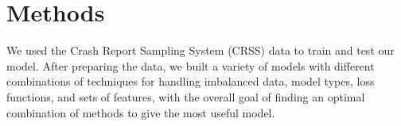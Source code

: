 \section{Methods}

We used the Crash Report Sampling System (CRSS) \cite{CRSS} data to train and test our model.  After preparing the data, we built a variety of models with different combinations of techniques for handling imbalanced data, model types, loss functions, and sets of features, with the overall goal of finding an optimal combination of methods to give the most useful model.

